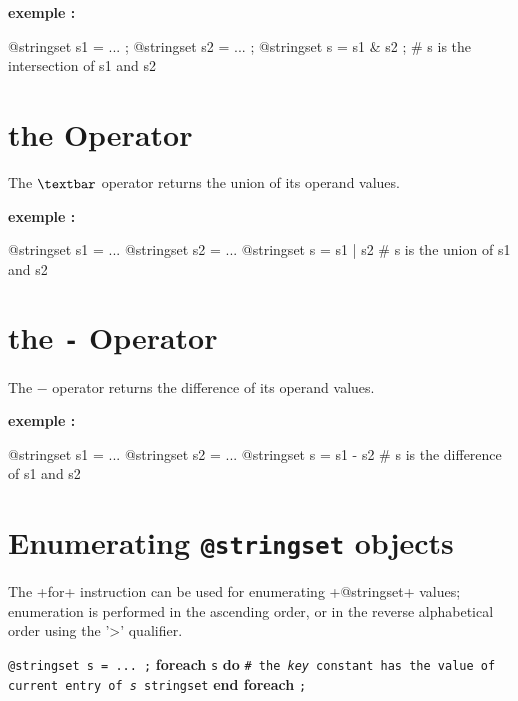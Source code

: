 \textbf{exemple :}
\begin{galgas4}
@stringset s1 = ... ;
@stringset s2 = ... ;
@stringset s = s1 & s2 ; # s is the intersection of s1 and s2
\end{galgas4}






\section{the \texttt{\textbar} Operator}

The \emph{$\textbar$} operator returns the union of its operand values.

\textbf{exemple :}
\begin{galgas4}
@stringset s1 = ...
@stringset s2 = ...
@stringset s = s1 | s2 # s is the union of s1 and s2
\end{galgas4}






\section{the \texttt{-} Operator}

The \emph{$-$} operator returns the difference of its operand values.

\textbf{exemple :}
\begin{galgas4}
@stringset s1 = ...
@stringset s2 = ...
@stringset s = s1 - s2 # s is the difference of s1 and s2
\end{galgas4}








\section{Enumerating \texttt{@stringset} objects}


The \ggsq+for+ instruction can be used for enumerating \ggsq+@stringset+ values; enumeration is performed in the ascending order, or in the reverse alphabetical order using the '>' qualifier.

\texttt{@stringset s = ... ;}\newline
\textbf{foreach} \texttt {s} \textbf {do}\newline
\texttt{\# the \emph{key} constant has the value of current entry of \emph{s} stringset}\newline
\textbf{end foreach} \texttt{;}







